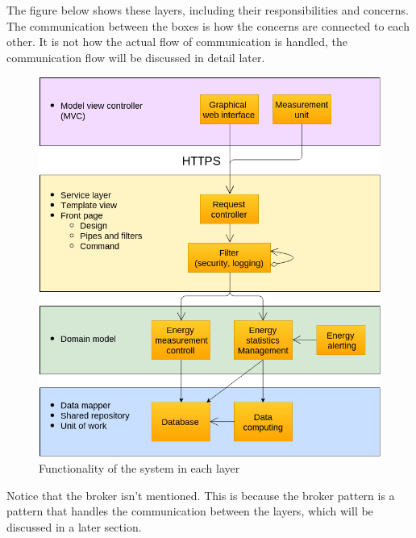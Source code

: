 The figure below shows these layers, including their responsibilities and concerns. The communication between the boxes is how the concerns are connected to each other. It is not how the actual flow of communication is handled, the communication flow will be discussed in detail later. 

\begin{figure}[H]
\centering
\includegraphics[scale=0.5]{7-software/images/layersflow.png}
\caption{Functionality of the system in each layer}
\label{fig:layersflow}
\end{figure}

Notice that the broker isn't mentioned. This is because the broker pattern is a pattern that handles the communication between the layers, which will be discussed in a later section.

